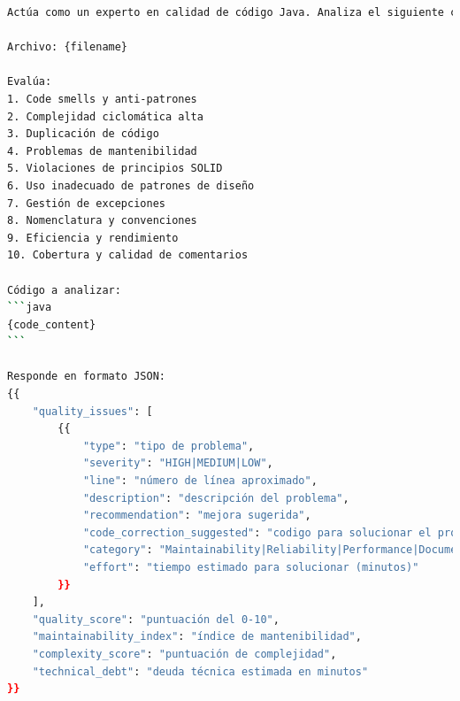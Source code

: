 \begin{lstlisting}[language=bash, caption={Prompt para el análisis de calidad de ficheros Java.}, label={lst:prompt_qual}]
Actúa como un experto en calidad de código Java. Analiza el siguiente código para identificar problemas de calidad:

Archivo: {filename}

Evalúa:
1. Code smells y anti-patrones
2. Complejidad ciclomática alta
3. Duplicación de código
4. Problemas de mantenibilidad
5. Violaciones de principios SOLID
6. Uso inadecuado de patrones de diseño
7. Gestión de excepciones
8. Nomenclatura y convenciones
9. Eficiencia y rendimiento
10. Cobertura y calidad de comentarios

Código a analizar:
```java
{code_content}
```

Responde en formato JSON:
{{
    "quality_issues": [
        {{
            "type": "tipo de problema",
            "severity": "HIGH|MEDIUM|LOW",
            "line": "número de línea aproximado",
            "description": "descripción del problema",
            "recommendation": "mejora sugerida",
            "code_correction_suggested": "codigo para solucionar el problema",
            "category": "Maintainability|Reliability|Performance|Documentation",
            "effort": "tiempo estimado para solucionar (minutos)"
        }}
    ],
    "quality_score": "puntuación del 0-10",
    "maintainability_index": "índice de mantenibilidad",
    "complexity_score": "puntuación de complejidad",
    "technical_debt": "deuda técnica estimada en minutos"
}}
\end{lstlisting}

